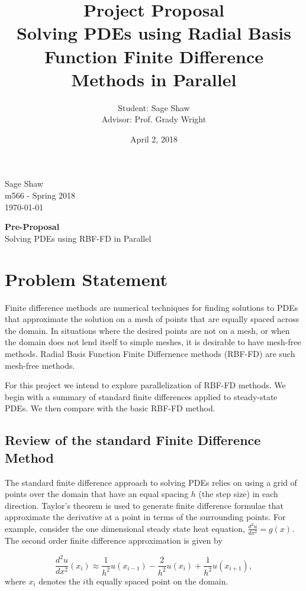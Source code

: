 \documentclass[12pt]{article}
\title{Project Proposal\\ \large Solving PDEs using Radial Basis Function Finite Difference Methods in Parallel}
\author{Student: Sage Shaw\\ Advisor: Prof. Grady Wright}
\date{April 2, 2018}
\begin{document}
	\thispagestyle{empty}
	
	\begin{flushright}
		Sage Shaw \\
		m566 - Spring 2018 \\
		\today
	\end{flushright}
	
	\begin{center}
		\Huge \textbf{Pre-Proposal} \\
		\large Solving PDEs using RBF-FD in Parallel
	\end{center}

\section{Problem Statement} 
Finite difference methods are numerical techniques for finding solutions to PDEs that approximate the solution on a mesh of points that are equally spaced across the domain. In situations where the desired points are not on a mesh, or when the domain does not lend itself to simple meshes, it is desirable to have mesh-free methods. Radial Basis Function Finite Differnence methods (RBF-FD) are such mesh-free methods. 

For this project we intend to explore parallelization of RBF-FD methods. We begin with a summary of standard finite differences applied to steady-state PDEs. We then compare with the basic RBF-FD method. 

\subsection{Review of the standard Finite Difference Method} 
The standard finite difference approach to solving PDEs relies on using a grid of points over the domain that have an equal spacing $h$ (the step size) in each direction. Taylor's theorem is used to generate finite difference formulae that approximate the derivative at a point in terms of the surrounding points. For example, consider the one dimensional steady state heat equation, $\frac{d^2u}{dx^2} = g(x)$. The second order finite difference approximation is given by

$$
\frac{d^2u}{dx^2}(x_i) \approx \frac{1}{h^2}u(x_{i-1}) - \frac{2}{h^2} u(x_i) + \frac{1}{h^2} u(x_{i+1}),
$$
where $x_i$ denotes the $i$th equally spaced point on the domain.
\end{document}
